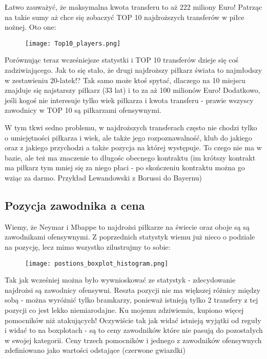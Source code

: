 \documentclass{article}
\begin{document}
Łatwo zauważyć, że maksymalna kwota transferu to aż 222 miliony Euro! Patrząc na takie sumy aż chce się zobaczyć TOP 10 najdroższych transferów w piłce nożnej. Oto one:

\begin{figure}[H]
    \centering
    \texttt{[image: Top10\_players.png]}
\end{figure}

Porównując teraz wcześniejsze statystki i TOP 10 transferów dzieje się coś zadziwiającego. Jak to się stało, że drugi najdroższy piłkarz świata to najmłodszy w zestawieniu 20-latek!? Tak samo może ktoś spytać, dlaczego na 10 miejscu znajduje się najstarszy piłkarz (33 lat) i to za aż 100 milionów Euro!
Dodatkowo, jeśli kogoś nie interesuje tylko wiek piłkarza i kwota transferu - prawie wszyscy zawodnicy w TOP 10 są piłkarzami ofensywnymi. 

W tym tkwi sedno problemu, w najdroższych transferach często nie chodzi tylko o umiejętności piłkarza i wiek, ale także jego rozpoznawalność, klub do jakiego oraz z jakiego przychodzi a także pozycja na której występuje. To czego nie ma w bazie, ale też ma znaczenie to długośc obecnego kontraktu (im krótszy kontrakt ma piłkarz tym mniej się za niego płaci - po skończeniu kontraktu można go wziąc za darmo. Przykład Lewandowski z Borussi do Bayernu)

\subsection{Pozycja zawodnika a cena}
Wiemy, że Neymar i Mbappe to najdrożsi piłkarze na świecie oraz oboje są są zawodnikami ofensywnymi. Z poprzednich statystyk wiemu już nieco o podziale na pozycję, lecz mimo wszystko zilustrujmy to sobie:

\begin{figure}[H]
    \centering
    \texttt{[image: postions\_boxplot\_histogram.png]}
\end{figure}

Tak jak wcześniej można było wywnioskować ze statystyk - zdecydowanie najdrożsi są zawodnicy ofensywni. Reszta pozycji nie ma większej różnicy między sobą - można wyróżnić tylko bramkarzy, ponieważ istnieją tylko 2 transfery z tej pozycji co jest lekko niemiarodajne. Ku mojemu zdziwiemiu, kupiono więcej pomocników niż atakujących! Oczywiście tak jak widać istnieją wyjątki od reguły i widać to na boxplotach - są to ceny zawodników które nie pasują do pozostałych w swojej kategorii. Ceny trzech pomocników i jednego z zawodników ofensywnych zdefiniowano jako wartości odstające (czerwone gwiazdki)
\end{document}
